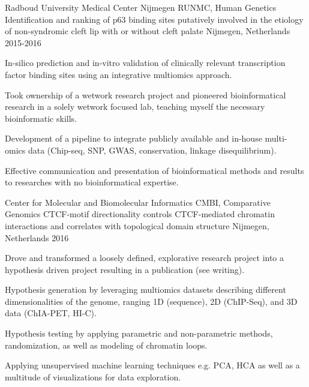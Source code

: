 

\begin{cventries}

  \cventry
    {Radboud University Medical Center Nijmegen RUNMC, Human Genetics} %
    {Identification and ranking of p63 binding sites putatively
    involved in the etiology of non-syndromic cleft lip with or
    without cleft palate} %
    {Nijmegen, Netherlands} %
    {2015-2016} %
    { 
      \begin{cvitems} %
        \item {In-silico prediction and in-vitro validation of clinically relevant transcription factor binding sites using an integrative multiomics approach.}
        \item {Took ownership of a wetwork research project and pioneered bioinformatical research in a solely wetwork focused lab, teaching myself the necessary bioinformatic skills.}
        \item {Development of a pipeline to integrate publicly available and in-house multi-omics data (Chip-seq, SNP, GWAS, conservation, linkage disequilibrium).}
        \item {Effective communication and presentation of bioinformatical methods and results to researches with no bioinformatical expertise.}
      \end{cvitems}
    }

  \cventry
    {Center for Molecular and Biomolecular Informatics CMBI, Comparative Genomics} %
    {CTCF-motif directionality controls CTCF-mediated chromatin interactions
    and correlates with topological domain structure} %
    {Nijmegen, Netherlands} %
    {2016} %
    {
      \begin{cvitems} %
        \item {Drove and transformed a loosely defined, explorative research project into a hypothesis driven project resulting in a publication (see writing).}
        \item {Hypothesis generation by leveraging multiomics datasets describing different dimensionalities of the genome, ranging 1D (sequence), 2D (ChIP-Seq), and 3D data (ChIA-PET, HI-C).}
        \item {Hypothesis testing by applying parametric and non-parametric methods, randomization, as well as modeling of chromatin loops.}
        \item {Applying unsupervised machine learning techniques e.g. PCA, HCA as well as a multitude of visualizations for data exploration.}
      \end{cvitems}
    }


\end{cventries}
